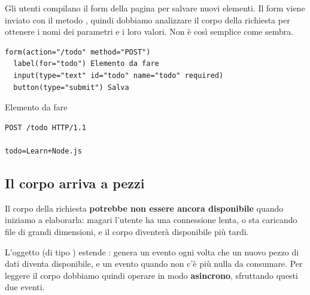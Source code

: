 Gli utenti compilano il form della pagina per salvare nuovi elementi. Il form
viene inviato con il metodo , quindi dobbiamo analizzare il corpo
della richiesta per ottenere i nomi dei parametri e i loro valori. Non è così
semplice come sembra.

\begin{affianco}[0.58][c]
\begin{lstlisting}[style=pug, name=todo.pug]
form(action="/todo" method="POST")
  label(for="todo") Elemento da fare
  input(type="text" id="todo" name="todo" required)
  button(type="submit") Salva
\end{lstlisting}
\risultato
\begin{browser}[todo]
  Elemento da fare \ 
\end{browser}
\begin{lstlisting}[style=http, name=Richiesta generata]
POST /todo HTTP/1.1

todo=Learn+Node.js
\end{lstlisting}
\end{affianco}

\subsection{Il corpo arriva a pezzi}

Il corpo della richiesta \textbf{potrebbe non essere ancora disponibile} quando
iniziamo a elaborarla: magari l'utente ha una connessione lenta, o sta caricando
file di grandi dimensioni, e il corpo diventerà disponibile più tardi.

L'oggetto  (di tipo ) estende
: genera un evento  ogni volta che un nuovo
pezzo di dati diventa disponibile, e un evento  quando non c'è più
nulla da consumare. Per leggere il corpo dobbiamo quindi operare in modo
\textbf{asincrono}, sfruttando questi due eventi.


